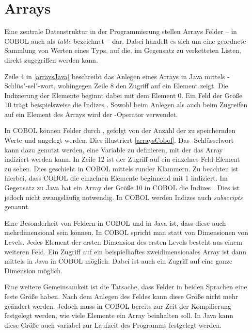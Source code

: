 \section{Arrays}\label{sec:felder}
Eine zentrale Datenstruktur in der Programmierung stellen Arrays \bzw Felder -- in COBOL auch als \textit{table} bezeichnet -- dar. Dabei handelt es sich um eine geordnete Sammlung von Werten eines Typs, auf die, im Gegensatz zu \zB verketteten Listen, direkt zugegriffen werden kann. 

Zeile 4 in \autoref{arraysJava} beschreibt das Anlegen eines Arrays in Java mittels -Schlüs"-sel"-wort, wohingegen Zeile 8 den Zugriff auf ein Element zeigt. Die Indizierung der Elemente beginnt dabei mit dem Element 0. Ein Feld der Größe 10 trägt beispielsweise die Indizes . Sowohl beim Anlegen als auch beim Zugreifen auf ein Element des Arrays wird der \jav{[]}-Operator verwendet.


In COBOL können Felder durch , gefolgt von der Anzahl der zu speichernden Werte und  angelegt werden. Dies illustriert \autoref{arraysCobol}. Das -Schlüsselwort kann dazu genutzt werden, eine Variable zu definieren, mit der das Array indiziert werden kann. In Zeile 12 ist der Zugriff auf ein einzelnes Feld-Element zu sehen. Dies geschieht in COBOL mittels runder Klammern. Zu beachten ist hierbei, dass COBOL die einzelnen Elemente beginnend mit 1 indiziert. Im Gegensatz zu Java hat ein Array der Größe 10 in COBOL die Indizes . Dies ist jedoch nicht zwangsläufig notwendig. In COBOL werden Indizes auch \textit{subscripts} genannt.


Eine Besonderheit von Feldern in COBOL und in Java ist, dass diese auch mehrdimensional sein können. In COBOL spricht man statt von Dimensionen von Levels. Jedes Element der ersten Dimension \bzw des ersten Levels besteht aus einem weiteren Feld. Ein Zugriff auf ein beispielhaftes zweidimensionales Array ist dann mittels \jav{[][]} in Java \bzw {} in COBOL möglich. Dabei ist auch ein Zugriff auf eine ganze Dimension möglich.

Eine weitere Gemeinsamkeit ist die Tatsache, dass Felder in beiden Sprachen eine feste Größe haben. Nach dem Anlegen des Feldes kann diese Größe nicht mehr geändert werden. Jedoch muss in COBOL bereits zur Zeit der Kompilierung festgelegt werden, wie viele Elemente ein Array beinhalten soll. In Java kann diese Größe auch variabel zur Laufzeit des Programms festgelegt werden.
